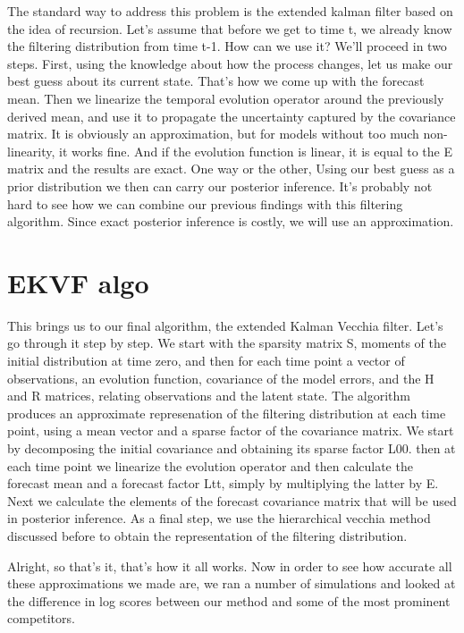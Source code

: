 \documentclass[12pt]{article} %
\begin{document}
The standard way to address this problem is the extended kalman filter based on the idea of recursion. Let's assume that before we get to time t, we already know the filtering distribution from time t-1. How can we use it?
We'll proceed in two steps. First, using the knowledge about how the process changes, let us make our best guess about its current state. That's how we come up with the forecast mean. Then we linearize the temporal evolution operator around the previously derived mean, and use it to propagate the uncertainty captured by the covariance matrix. It is obviously an approximation, but for models without too much non-linearity, it works fine. And if the evolution function is linear, it is equal to the E matrix and the results are exact. One way or the other, Using our best guess as a prior distribution we then can carry our posterior inference. It's probably not hard to see how we can combine our previous findings with this filtering algorithm. Since exact posterior inference is costly, we will use an approximation.


\newpage
\section*{EKVF algo}


This brings us to our final algorithm, the extended Kalman Vecchia filter. Let's go through it step by step. We start with the sparsity matrix S, moments of the initial distribution at time zero, and then for each time point a vector of observations, an evolution function, covariance of the model errors, and the H and R matrices, relating observations and the latent state. The algorithm produces an approximate represenation of the filtering distribution at each time point, using a mean vector and a sparse factor of the covariance matrix. We start by decomposing the initial covariance and obtaining its sparse factor L00. then at each time point we linearize the evolution operator and then calculate the forecast mean and a forecast factor Ltt, simply by multiplying the latter by E. Next we calculate the elements of the forecast covariance matrix that will be used in posterior inference. As a final step, we use the hierarchical vecchia method discussed before to obtain the representation of the filtering distribution.

Alright, so that's it, that's how it all works. Now in order to see how accurate all these approximations we made are, we ran a number of simulations and looked at the difference in log scores between our method and some of the most prominent competitors. 
\end{document}
